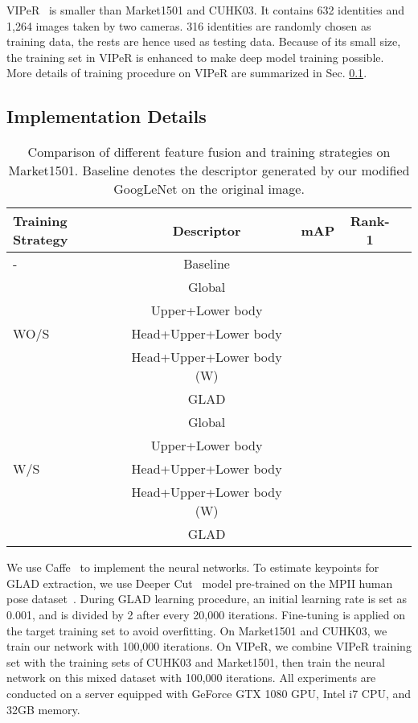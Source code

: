 \documentclass[sigconf]{acmart}
\begin{document}
VIPeR~\cite{viper} is smaller than Market1501 and CUHK03. It contains 632 identities and 1,264 images taken by two cameras. 316 identities are randomly chosen as training data, the rests are hence used as testing data. Because of its small size, the training set in VIPeR is enhanced to make deep model training possible. More details of training procedure on VIPeR are summarized in Sec. \ref{sec:Train}.

\subsection{Implementation Details}\label{sec:Train}

\begin{table}
\centering
\small
\caption{Comparison of different feature fusion and training strategies on Market1501. Baseline denotes the descriptor generated by our modified GoogLeNet \cite{googlenet} on the original image.}
\begin{tabular}{lcccc}
\hline
 Training Strategy & Descriptor  & mAP &  Rank-1\\
\hline
- &Baseline    &   &  \\
\hline
& Global &   &  \\
& Upper+Lower body     &  &  \\
WO/S& Head+Upper+Lower body       &  &  \\
& Head+Upper+Lower body (W)     &  &  \\
& GLAD     &  & \\
\hline
& Global &   &  \\
& Upper+Lower body    &  &  \\
W/S& Head+Upper+Lower body       &  &  \\
& Head+Upper+Lower body (W)    &  &  \\
& GLAD    &  & \\
\hline
\end{tabular}
\label{tab:GLN_Combination}
\end{table}

We use Caffe~\cite{caffe} to implement the neural networks. To estimate keypoints for GLAD extraction, we use Deeper Cut~\cite{DeeperCut} model pre-trained on the MPII human pose dataset~\cite{MP}. During GLAD learning procedure, an initial learning rate is set as 0.001, and is divided by 2 after every 20,000 iterations. Fine-tuning is applied on the target training set to avoid overfitting. On Market1501 and CUHK03, we train our network with 100,000 iterations. On VIPeR, we combine VIPeR training set with the training sets of CUHK03 and Market1501, then train the neural network on this mixed dataset with 100,000 iterations. All experiments are conducted on a server equipped with GeForce GTX 1080 GPU, Intel i7 CPU, and 32GB memory.
\end{document}

